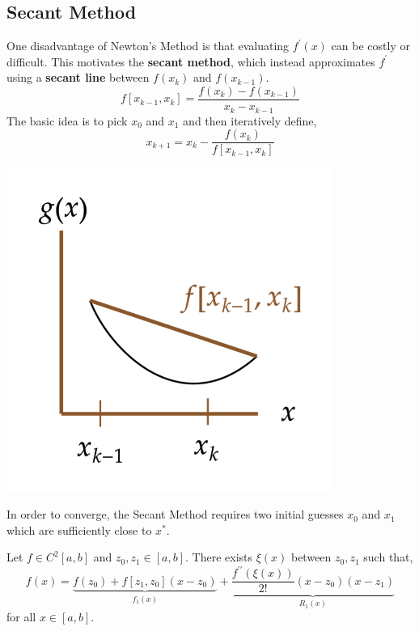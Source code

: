 \subsection{Secant Method}
One disadvantage of Newton's Method is that evaluating $f^{\prime}(x)$ can be costly or difficult. This motivates the \textbf{secant method}, which instead approximates $f^{\prime}$ using a \textbf{secant line} between $f(x_k)$ and $f(x_{k-1})$.
\[f\left[x_{k-1}, x_k\right]=\frac{f\left(x_k\right)-f\left(x_{k-1}\right)}{x_k-x_{k-1}}\]
The basic idea is to pick $x_0$ and $x_1$ and then iteratively define,
\[x_{k+1}=x_k-\frac{f\left(x_k\right)}{f\left[x_{k-1}, x_k\right]}\]

\begin{marginfigure}
\begin{center}
       \includegraphics[width=0.8\textwidth]{figures/fig-3.png}
\end{center}
\end{marginfigure}

\begin{marginfigure}
    In order to converge, the Secant Method requires two initial guesses $x_0$ and $x_1$ which are sufficiently close to $x^*$.
\end{marginfigure}

\begin{defn}
   \sloppy Let $f \in C^2[a, b]$ and $z_0, z_1 \in [a, b]$. There exists $\xi(x)$ between $z_0, z_1$ such that,
   \[
    f(x)=\underbrace{f\left(z_0\right)+f\left[z_1, z_0\right]\left(x-z_0\right)}_{f_1(x)}+\underbrace{\frac{f^{\prime \prime}(\xi(x))}{2 !}\left(x-z_0\right)\left(x-z_1\right)}_{R_1(x)}
    \]
    for all $x \in [a,b]$.
\end{defn}

